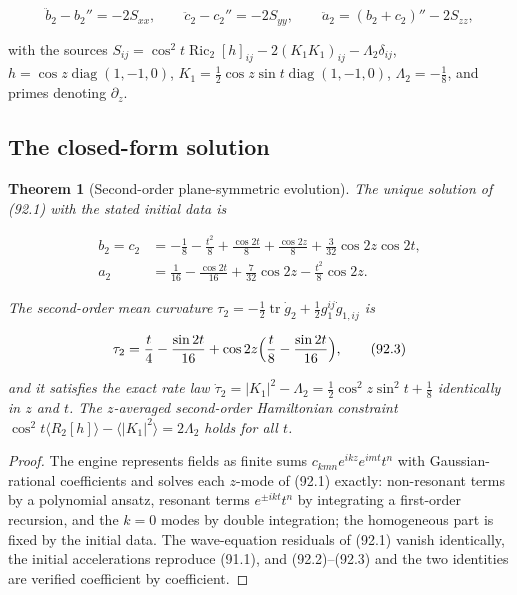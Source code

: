 \documentclass[11pt]{article}
\newtheorem{theorem}{Theorem}[section]
\theoremstyle{remark}
\begin{document}
\[
 \ddot b_2-b_2''=-2S_{xx},\qquad
 \ddot c_2-c_2''=-2S_{yy},\qquad
 \ddot a_2=(b_2+c_2)''-2S_{zz},                                       \tag{92.1}
\]

with the sources
\(S_{ij}=\cos^2t\operatorname{Ric}_2[h]_{ij}-2(K_1K_1)_{ij}-\Lambda_2\delta_{ij}\),
\(h=\cos z\operatorname{diag}(1,-1,0)\), \(K_1=\tfrac12\cos z\sin t\operatorname{diag}(1,-1,0)\),
\(\Lambda_2=-\tfrac18\), and primes denoting \(\partial_z\).

\subsection{The closed-form solution}

\begin{theorem}[Second-order plane-symmetric evolution]
\label{thm:v19v89-solution}
The unique solution of (92.1) with the stated initial data is

\[
\begin{aligned}
 b_2=c_2&=-\frac18-\frac{t^2}8+\frac{\cos2t}8+\frac{\cos2z}8+\frac3{32}\cos2z\cos2t,\\
 a_2&=\frac1{16}-\frac{\cos2t}{16}+\frac7{32}\cos2z-\frac{t^2}8\cos2z.
\end{aligned}                                                          \tag{92.2}
\]

The second-order mean curvature
\(\tau_2=-\tfrac12\operatorname{tr}\dot g_2+\tfrac12g_1^{ij}\dot g_{1,ij}\)
is

\[
 \tau_2=\frac t4-\frac{\sin2t}{16}+\cos2z\Bigl(\frac t8-\frac{\sin2t}{16}\Bigr),
                                                                    \tag{92.3}
\]

and it satisfies the exact rate law
\(\dot\tau_2=|K_1|^2-\Lambda_2=\tfrac12\cos^2z\sin^2t+\tfrac18\)
identically in \(z\) and \(t\).  The \(z\)-averaged second-order
Hamiltonian constraint
\(\cos^2t\langle R_2[h]\rangle-\langle|K_1|^2\rangle=2\Lambda_2\)
holds for all \(t\).
\end{theorem}

\begin{proof}
The engine represents fields as finite sums
\(c_{kmn}e^{ikz}e^{imt}t^n\) with Gaussian-rational coefficients and
solves each \(z\)-mode of (92.1) exactly: non-resonant terms by a
polynomial ansatz, resonant terms \(e^{\pm ikt}t^n\) by integrating a
first-order recursion, and the \(k=0\) modes by double integration;
the homogeneous part is fixed by the initial data.  The wave-equation
residuals of (92.1) vanish identically, the initial accelerations
reproduce (91.1), and (92.2)--(92.3) and the two identities are
verified coefficient by coefficient.
\end{proof}
\end{document}
